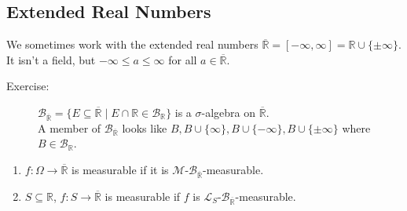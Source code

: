 \documentclass[9pt]{extarticle}
\newcommand{\R}{\mathbb{R}}
\begin{document}
  \subsection{Extended Real Numbers}%
  We sometimes work with the extended real numbers $\overline{\R} = [-\infty,\infty] = \R\cup \{\pm \infty\}$. It isn't a field, but $-\infty \leq a \leq \infty$ for all $a\in \overline{\R}$.
  \begin{description}
    \item[Exercise:] $\mathcal{B}_{\overline{\R}}= \{E\subseteq \overline{\R}\mid E\cap \R \in \mathcal{B}_{\R}\}$ is a $\sigma$-algebra on $\overline{\R}$.\\

      A member of $\mathcal{B}_{\overline{\R}}$ looks like $B,B \cup \{\infty\},B\cup \{-\infty\},B\cup \{\pm \infty\}$ where $B\in \mathcal{B}_{\R}$.
  \end{description}
  \begin{enumerate}[(1)]
    \item $f: \Omega \rightarrow \overline{\R}$ is measurable if it is $\mathcal{M}$-$\mathcal{B}_{\overline{\R}}$-measurable.
    \item $S\subseteq \R$, $f: S\rightarrow \overline{\R}$ is measurable if $f$ is $\mathcal{L}_{S}$-$\mathcal{B}_{\overline{\R}}$-measurable.
  \end{enumerate}
\end{document}
